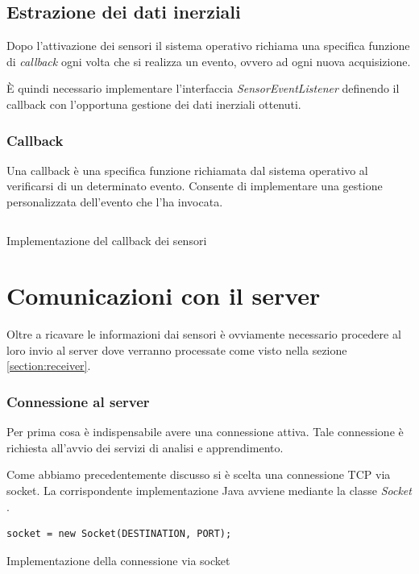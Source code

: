 \newpage
\subsection{Estrazione dei dati inerziali}
Dopo l'attivazione dei sensori il sistema operativo richiama una specifica funzione di \textit{callback} ogni volta 
che si realizza un evento, ovvero ad ogni nuova acquisizione.

È quindi necessario implementare l'interfaccia \textit{SensorEventListener} \cite{sensor_listener} definendo il 
callback con l'opportuna gestione dei dati inerziali ottenuti.

\subsubsection{Callback}
Una callback è una specifica funzione richiamata dal sistema operativo al verificarsi di un determinato evento.
Consente di implementare una gestione personalizzata dell'evento che l'ha invocata.
\vfill
\begin{listing}[H] 
    \inputminted[frame=single,framesep=10pt]{java}{assets/snippets/app/sensors.java}
    \caption{Implementazione del callback dei sensori}
    \label{listing:sensor-event-callback}
\end{listing}

\newpage
\section{Comunicazioni con il server}
Oltre a ricavare le informazioni dai sensori è ovviamente necessario procedere al loro invio al server  
dove verranno processate come visto nella sezione \ref{section:receiver}.
\subsubsection{Connessione al server}
Per prima cosa è indispensabile avere una connessione attiva. Tale connessione è richiesta all'avvio dei servizi di 
analisi e apprendimento.

Come abbiamo precedentemente discusso si è scelta una connessione TCP via socket. La corrispondente implementazione Java
avviene mediante la classe \textit{Socket} \cite{socket}.
\begin{listing}[H] 
    \begin{verbatim}
socket = new Socket(DESTINATION, PORT);
    \end{verbatim}
    \caption{Implementazione della connessione via socket}
\end{listing}

